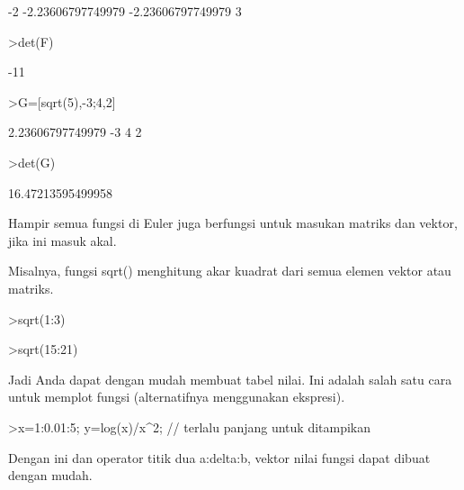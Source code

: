 \documentclass[a4paper,10pt]{article}
\begin{document}
\begin{eulernotebook}
\begin{eulercomment}
\begin{eulercomment}
\begin{eulercomment}
\begin{eulercomment}
\begin{eulercomment}
\begin{eulercomment}
\begin{eulerprompt}
\end{eulerprompt}
\begin{euleroutput}
                       -2       -2.23606797749979 
        -2.23606797749979                       3 
\end{euleroutput}
\begin{eulerprompt}
>det(F)
\end{eulerprompt}
\begin{euleroutput}
  -11
\end{euleroutput}
\begin{eulerprompt}
>G=[sqrt(5),-3;4,2]
\end{eulerprompt}
\begin{euleroutput}
         2.23606797749979                      -3 
                        4                       2 
\end{euleroutput}
\begin{eulerprompt}
>det(G)
\end{eulerprompt}
\begin{euleroutput}
  16.47213595499958
\end{euleroutput}
\begin{eulercomment}
Hampir semua fungsi di Euler juga berfungsi untuk masukan matriks dan
vektor, jika ini masuk akal.

Misalnya, fungsi sqrt() menghitung akar kuadrat dari semua elemen
vektor atau matriks.
\end{eulercomment}
\begin{eulerprompt}
>sqrt(1:3)
\end{eulerprompt}
\begin{euleroutput}
  [1,  1.414213562373095,  1.732050807568877]
\end{euleroutput}
\begin{eulerprompt}
>sqrt(15:21)
\end{eulerprompt}
\begin{euleroutput}
  [3.872983346207417,  4,  4.123105625617661,  4.242640687119285,
  4.358898943540674,  4.47213595499958,  4.58257569495584]
\end{euleroutput}
\begin{eulercomment}
Jadi Anda dapat dengan mudah membuat tabel nilai. Ini adalah salah
satu cara untuk memplot fungsi (alternatifnya menggunakan ekspresi).
\end{eulercomment}
\begin{eulerprompt}
>x=1:0.01:5; y=log(x)/x^2; // terlalu panjang untuk ditampikan
\end{eulerprompt}
\begin{eulercomment}
Dengan ini dan operator titik dua a:delta:b, vektor nilai fungsi dapat
dibuat dengan mudah.


\end{eulercomment}
\end{eulercomment}
\end{eulercomment}
\end{eulercomment}
\end{eulercomment}
\end{eulercomment}
\end{eulercomment}
\end{eulernotebook}
\end{document}

